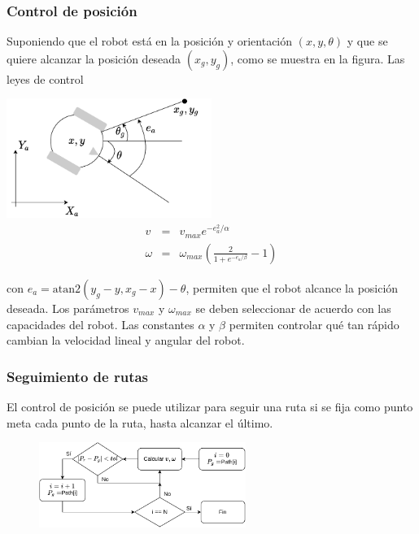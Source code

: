 \begin{frame}\frametitle{Control de posición}
  Suponiendo que el robot está en la posición y orientación $(x,y, \theta)$ y que se quiere alcanzar la posición deseada $(x_g, y_g)$, como se muestra en la figura. Las leyes de control
  \begin{multicols}{2}
    \includegraphics[width=0.5\textwidth]{Figures/GoalPose.pdf}
    \[\]
  \begin{eqnarray*}
    v &=& v_{max} e^{-e_a^2/\alpha}\\
    \omega &=& \omega_{max}\left(\frac{2}{1 + e^{-e_a/\beta}} - 1\right)
  \end{eqnarray*}
  \end{multicols}
  con $e_a = \textrm{atan2}(y_g - y, x_g - x) - \theta$, permiten que el robot alcance la posición deseada. Los parámetros $v_{max}$ y $\omega_{max}$ se deben seleccionar de acuerdo con las capacidades del robot. Las constantes $\alpha$ y $\beta$ permiten controlar qué tan rápido cambian la velocidad lineal y angular del robot. 
\end{frame}


\begin{frame}\frametitle{Seguimiento de rutas}
  El control de posición se puede utilizar para seguir una ruta si se fija como punto meta cada punto de la ruta, hasta alcanzar el último.
  \begin{figure}
    \centering
    \includegraphics[width=0.6\textwidth]{Figures/PathFollowing.pdf}
  \end{figure}
\end{frame}


